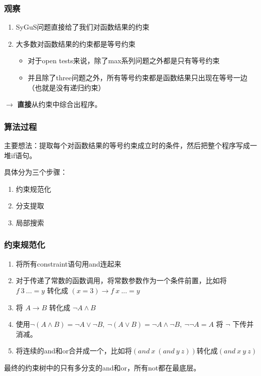 \documentclass[notheorems]{beamer} %
\begin{document}
  \begin{frame}
    \frametitle{观察}
    \begin{enumerate}
      \item SyGuS问题直接给了我们对函数结果的约束
      \item 大多数对函数结果的约束都是等号约束
      \begin{itemize}
        \item 对于open tests来说，除了max系列问题之外都是只有等号约束
        \item 并且除了three问题之外，所有等号约束都是函数结果只出现在等号一边（也就是没有递归约束）
      \end{itemize}
    \end{enumerate}
    $\to$ \textbf{直接}从约束中综合出程序。
  \end{frame}
  \begin{frame}
    \frametitle{算法过程}
    主要想法：提取每个对函数结果的等号约束成立时的条件，然后把整个程序写成一堆if语句。

    具体分为三个步骤：
    \begin{enumerate}
      \item 约束规范化
      \item 分支提取
      \item 局部搜索
    \end{enumerate}
  \end{frame}
  \begin{frame}
    \frametitle{约束规范化}
    \begin{enumerate}
      \item 将所有constraint语句用and连起来
      \item 对于传递了常数的函数调用，将常数参数作为一个条件前置，比如将 $f\ 3\ ... = y$ 转化成 $(x = 3)\to f\ x\ ... = y$
      \item 将 $A\to B$ 转化成 $\neg A \land B$
      \item 使用$\neg (A\land B) = \neg A \lor \neg B,\ \neg (A\lor B)=\neg A\land \neg B,\ \neg \neg A = A$ 将 $\neg$ 下传并消减。
      \item 将连续的and和or合并成一个，比如将$(and\ x\ (and\ y\ z))$转化成$(and\ x\ y\ z)$
    \end{enumerate}
    最终的约束树中的只有多分支的and和or，所有not都在最底层。
  \end{frame}
\end{document}
